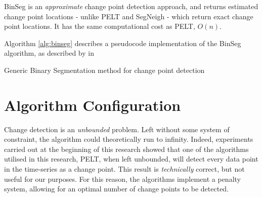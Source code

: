 \documentclass[../main.tex]{subfiles}
\begin{document}
BinSeg is an \emph{approximate} change point detection approach, and returns estimated change point locations - unlike PELT and SegNeigh - which return exact change point locations. It has the same computational cost as PELT, $O(n)$.

Algorithm \autoref{alg:binseg} describes a pseudocode implementation of the BinSeg algorithm, as described by \citeauthor{Eckley2011} in  \cite{Eckley2011}\newline

\begin{algorithm}[H]
    \label{alg:binseg}
    \caption{Generic Binary Segmentation method for change point detection}
    \DontPrintSemicolon
    \bigskip
\end{algorithm}

\section{Algorithm Configuration}

Change detection is an \emph{unbounded} problem. Left without some system of constraint, the algorithm could theoretically run to infinity. Indeed, experiments carried out at the beginning of this research showed that one of the algorithms utilised in this research, PELT, when left unbounded, will detect every data point in the time-series as a change point. This result is \textit{technically} correct, but not useful for our purposes. For this reason, the algorithms implement a penalty system, allowing for an optimal number of change points to be detected.
\end{document}
